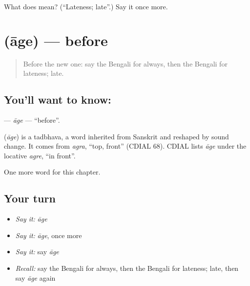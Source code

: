 \begin{tcolorbox}[breakable,colback=teal!4,colframe=teal!35!black,title={Before you move on}]
What does  mean? (\textquotedblleft{}Lateness; late\textquotedblright{}.) Say it once more.
\end{tcolorbox}
\section[\texorpdfstring{\bn{আগে} (āge)}{আগে (āge)}]{ (āge) — before}

\label{lesson:BN-C80-age}



\begin{quote}
Before the new one: say the Bengali for always, then the Bengali for lateness; late.
\end{quote}

\subsection*{You'll want to know: }
\textbf{} — \emph{āge} — \textquotedblleft{}before\textquotedblright{}.

\begin{cousinweb}
\textbf{} (\emph{āge}) is a tadbhava, a word inherited from Sanskrit and reshaped by sound change. It comes from \emph{agra}, \textquotedblleft{}top, front\textquotedblright{} (CDIAL 68). CDIAL lists \emph{āge} under the locative \emph{agre}, \textquotedblleft{}in front\textquotedblright{}.
\end{cousinweb}

\begin{grammarlens}[title={What you've built}]
One more word for this chapter.
\end{grammarlens}

\subsection*{Your turn}
\begin{itemize}
\raggedright
  \item \emph{Say it:} \emph{āge}
  \item \emph{Say it:} \emph{āge}, once more
  \item \emph{Say it:} say \emph{āge}
  \item \emph{Recall:} say the Bengali for always, then the Bengali for lateness; late, then say \emph{āge} again
\end{itemize}

